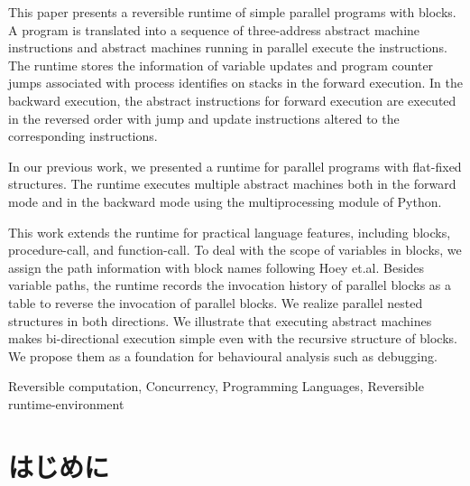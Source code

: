 \documentclass[submit,PRO]{ipsj}
\begin{document}
\begin{eabstract}
This paper presents a reversible runtime of simple parallel programs
with blocks.  A program is translated into a sequence of three-address
abstract machine instructions and abstract machines running in
parallel execute the instructions.  The runtime stores the information
of variable updates and program counter jumps associated with process
identifies on stacks in the forward execution. 
In the backward
execution, the abstract instructions for forward execution are
executed in the reversed order with jump and update instructions altered to
the corresponding instructions.

In our previous work, we presented a runtime for parallel programs with
flat-fixed structures.  The runtime executes multiple abstract
machines%
both in the forward mode and in the backward mode%
using the multiprocessing module of Python.

This work extends the runtime for practical language features,
including blocks, procedure-call, and function-call. To deal with the
scope of variables in blocks, we assign the path information with
block names following Hoey et.al.  Besides variable paths, the runtime
records the invocation history of parallel blocks as a table to
reverse the invocation of parallel blocks.  We realize parallel nested
structures in both directions.  We illustrate that executing abstract
machines makes bi-directional execution simple even with the recursive
structure of blocks.  We propose them as a foundation for behavioural
analysis such as debugging.

\end{eabstract}

\begin{ekeyword}
Reversible computation, Concurrency, Programming Languages, Reversible runtime-environment
\end{ekeyword}

\maketitle

\section{はじめに}
\end{document}
